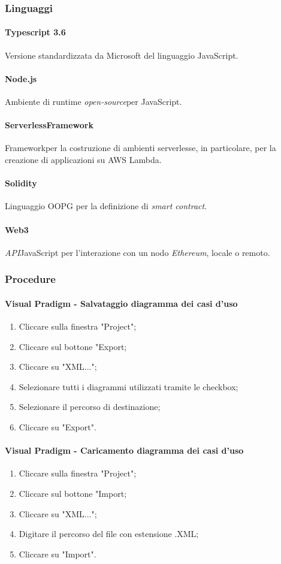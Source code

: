 \newpage \subsubsection{Linguaggi}
\paragraph{Typescript 3.6}
Versione standardizzata da Microsoft del linguaggio JavaScript.

\paragraph{Node.js}
Ambiente di runtime \textit{open-source}\glo per JavaScript.

\paragraph{Serverless\glo Framework\glo}
Framework\glo per la costruzione di ambienti serverless\glos e, in particolare, per la creazione di applicazioni su AWS Lambda.

\paragraph{Solidity}
Linguaggio OOPG per la definizione di \textit{smart contract}\glos.

\paragraph{Web3}
\textit{API}\glo JavaScript per l’interazione con un nodo \textit{Ethereum\glos}, locale o remoto.\\

\subsubsection{Procedure}
\paragraph{Visual Pradigm - Salvataggio diagramma dei casi d'uso}
\begin{enumerate}
	\item Cliccare sulla finestra "Project";
	\item Cliccare sul bottone "Export;
	\item Cliccare su "XML...";
	\item Selezionare tutti i diagrammi utilizzati tramite le checkbox;
	\item Selezionare il percorso di destinazione;
	\item Cliccare su "Export".
\end{enumerate}

\paragraph{Visual Pradigm - Caricamento diagramma dei casi d'uso}
\begin{enumerate}
	\item Cliccare sulla finestra "Project";
	\item Cliccare sul bottone "Import;
	\item Cliccare su "XML...";
	\item Digitare il percorso del file con estensione .XML;
	\item Cliccare su "Import".
\end{enumerate}
